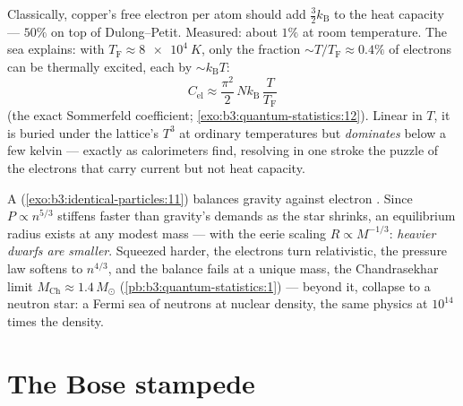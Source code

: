 \begin{example}\label{ex:b3:quantum-statistics:heat}
Classically, copper's free electron per atom should add $\tfrac32
k_{\text{B}}$ to the heat capacity --- $50\%$ on top of
Dulong--Petit. Measured: about $1\%$ at room temperature. The sea
explains: with $T_{\text{F}} \approx \qty{8e4}{K}$, only the
fraction $\sim T/T_{\text{F}} \approx 0.4\%$ of electrons can be
thermally excited, each by $\sim k_{\text{B}}T$:
\[
C_{\text{el}} \approx \frac{\pi^2}{2}\,
Nk_{\text{B}}\,\frac{T}{T_{\text{F}}}
\]
(the exact Sommerfeld coefficient;
\cref{exo:b3:quantum-statistics:12}). Linear in $T$, it is buried
under the lattice's $T^3$ at ordinary temperatures but
\emph{dominates} below a few kelvin --- exactly as calorimeters
find, resolving in one stroke the puzzle of the electrons that
carry current but not heat capacity.
\end{example}

\begin{example}\label{ex:b3:quantum-statistics:dwarf}
A  (\cref{exo:b3:identical-particles:11}) balances
gravity against electron . Since $P \propto
n^{5/3}$ stiffens faster than gravity's demands as the star
shrinks, an equilibrium radius exists at any modest mass --- with
the eerie scaling $R \propto M^{-1/3}$: \emph{heavier dwarfs are
smaller}. Squeezed harder, the electrons turn relativistic, the
pressure law softens to $n^{4/3}$, and the balance fails at a
unique mass, the Chandrasekhar limit $M_{\text{Ch}} \approx
1.4\,M_\odot$ (\cref{pb:b3:quantum-statistics:1}) --- beyond it,
collapse to a neutron star: a Fermi sea of neutrons at nuclear
density, the same physics at $10^{14}$ times the density.
\end{example}

\section{The Bose stampede}

